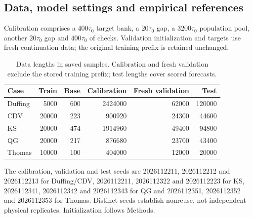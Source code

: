 \documentclass[gmd,manuscript]{copernicus}
\begin{document}
\subsection{Data, model settings and empirical references}\label{app:note7}
Calibration comprises a $400\tau_0$ target bank, a $20\tau_0$ gap, a $3200\tau_0$ population pool, another $20\tau_0$ gap and $400\tau_0$ of checks. Validation initialization and targets use fresh continuation data; the original training prefix is retained unchanged.

\begin{table}[htbp]\caption{Data lengths in saved samples. Calibration and fresh validation exclude the stored training prefix; test lengths cover scored forecasts.}\label{tab:v4-data}
\centering\small\begin{tabular}{lrrrrr}\toprule
Case & Train & Base & Calibration & Fresh validation & Test\\\midrule
Duffing & 5000 & 600 & 2424000 & 62000 & 120000 \\
CDV & 20000 & 223 & 900920 & 24300 & 44600 \\
KS & 20000 & 474 & 1914960 & 49400 & 94800 \\
QG & 20000 & 217 & 876680 & 23700 & 43400 \\
Thomas & 10000 & 100 & 404000 & 12000 & 20000 \\
\bottomrule\end{tabular}\end{table}
The calibration, validation and test seeds are 2026112211, 2026112212 and 2026112213 for Duffing/CDV, 2026112211, 2026112322 and 2026112223 for KS, 2026112341, 2026112342 and 2026112343 for QG and 2026112351, 2026112352 and 2026112353 for Thomas. Distinct seeds establish nonreuse, not independent physical replicates. Initialization follows Methods.
\end{document}
